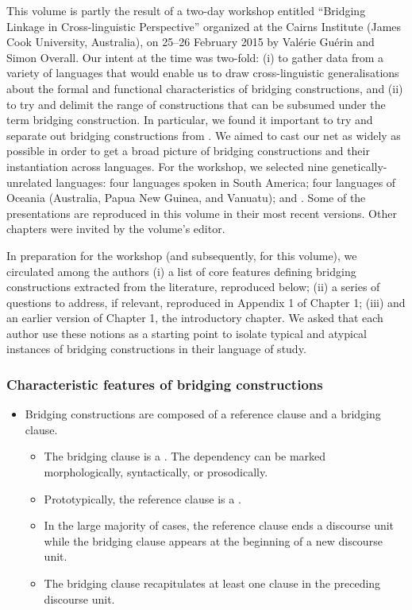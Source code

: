 \begin{refsection}


This volume is partly the result of a two-day workshop entitled ``Bridging Linkage in Cross-linguistic Perspective'' organized at the Cairns Institute (James Cook University, Australia), on 25--26 February 2015 by Valérie Guérin and Simon Overall. Our intent at the time was two-fold: (i) to gather data from a variety of languages that would enable us to draw cross-linguistic generalisations about the formal and functional characteristics of bridging constructions, and (ii) to try and delimit the range of constructions that can be subsumed under the term bridging construction. In particular, we found it important to try and separate out bridging constructions from . We aimed to cast our net as widely as possible in order to get a broad picture of bridging constructions and their instantiation across languages. For the workshop, we selected  nine genetically-unrelated languages: four languages spoken in South America; four languages of Oceania (Australia, Papua New Guinea, and Vanuatu); and . Some of the presentations are reproduced in this volume in their most recent versions. Other chapters were invited by the volume’s editor. 

In preparation for the workshop (and subsequently, for this volume), we circulated among the authors (i) a list of core features defining bridging constructions extracted from the literature, reproduced below; (ii) a series of questions to address, if relevant, reproduced in Appendix 1 of Chapter 1; (iii) and an earlier version of Chapter 1, the introductory chapter. We asked that each author use these notions as a starting point to isolate typical and atypical instances of bridging constructions in their language of study. 



\subsubsection*{Characteristic features of bridging constructions}


\begin{itemize}
\item Bridging constructions are composed of a reference clause and a bridging clause. 
   \begin{itemize}
   \item The bridging clause is a . The dependency can be marked morphologically, syntactically, or prosodically.
   \item  Prototypically, the reference clause is a . 
   \item In the large majority of cases, the reference clause ends a discourse unit while the bridging clause appears at the beginning of a new discourse unit.
   \item  The bridging clause recapitulates at least one clause in the preceding discourse unit. 
   \end{itemize}
   \end{itemize}
   

\end{refsection}
